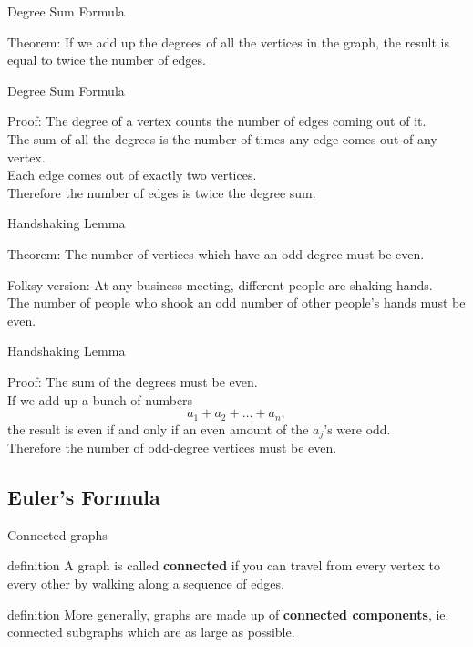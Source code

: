 \documentclass{beamer}
\begin{document}
\begin{frame}{Degree Sum Formula}
\pause
  \begin{block}{Theorem:}
    If we add up the degrees of all the vertices in the graph, the result is equal to twice the number of edges.
  \end{block}
\end{frame}

\begin{frame}{Degree Sum Formula}
\pause
  \begin{block}{Proof:}
\pause
    The degree of a vertex counts the number of edges coming out of it.\\
\pause
    The sum of all the degrees is the number of times any edge comes out of any vertex.\\
\pause
    Each edge comes out of exactly two vertices.\\
\pause
    Therefore the number of edges is twice the degree sum.
  \end{block}
\end{frame}

\begin{frame}{Handshaking Lemma}
\pause
  \begin{block}{Theorem:}
    The number of vertices which have an odd degree must be even.
  \end{block}
\pause
  \begin{block}{Folksy version:}
    At any business meeting, different people are shaking hands.\\
    The number of people who shook an odd number of other people's hands must be even.
  \end{block}
\end{frame}

\begin{frame}{Handshaking Lemma}
  \begin{block}{Proof:}
\pause
    The sum of the degrees must be even.\\
\pause
    If we add up a bunch of numbers
    $$a_1 + a_2 + \dots + a_n,$$
    the result is even if and only if an even amount of the $a_j$'s were odd.\\
\pause
    Therefore the number of odd-degree vertices must be even.
  \end{block}
\end{frame}

\subsection{Euler's Formula}
\begin{frame}{Connected graphs}
\pause
  \begin{block}{definition}
    A graph is called \textbf{connected} if you can travel from every vertex to every other by walking along a sequence of edges.
  \end{block}
  \begin{block}{definition}
    More generally, graphs are made up of \textbf{connected components}, ie. connected subgraphs which are as large as possible.
  \end{block}
\end{frame}
\end{document}
